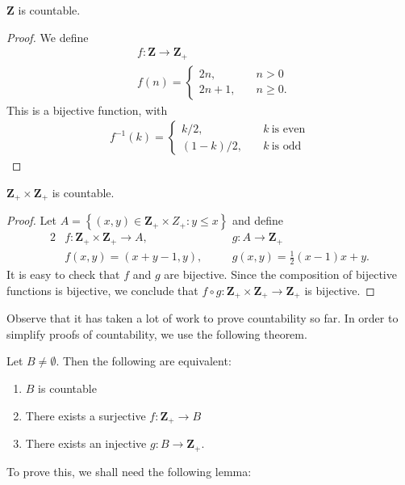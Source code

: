 \begin{claim}
	$\mathbf{Z}$ is countable.
\end{claim}
\begin{proof} We define
	\begin{equation*}
		\begin{split}
			& f: \mathbf{Z} \to \mathbf{Z}_{+}
			\\
			& f(n) = \begin{cases}
				2n, \quad & n > 0 \\
				2n+1, \quad & n \ge 0.
			\end{cases}
		\end{split}
	\end{equation*}
	This is a bijective function, with
	\begin{equation*}
		\begin{split}
			f^{-1}(k) =
			\begin{cases}
				k/2, \quad & k \ \text{is even} \\
				(1-k)/2, \quad & k \ \text{is odd}
			\end{cases}
		\end{split}
	\end{equation*}
\end{proof}
\begin{claim}
	$\mathbf{Z}_{+} \times \mathbf{Z}_{+}$ is countable.
\end{claim}
\begin{proof}Let $A = \left\{(x,y) \in \mathbf{Z}_{+} \times
	Z_{+}: y \le x\right\}$
	and define
	\begin{alignat*}{2}
			& f: \mathbf{Z}_{+} \times \mathbf{Z}_{+} \to A, \quad && g: A \to
			\mathbf{Z}_{+} \\
			& f(x,y) = (x + y-1, y),  \quad && g(x,y) = \frac{1}{2}(x-1)x + y.
		\end{alignat*}
	It is easy to check that $f$ and $g$ are bijective. Since the composition of
	bijective functions is bijective, we conclude that $f \circ g: \mathbf{Z}_{+}
	\times
\mathbf{Z}_{+} \to \mathbf{Z}_{+}$ is bijective.
\end{proof}

Observe that it has taken a lot of work to prove countability so far.
In order to simplify proofs of countability, we use the following theorem.
\begin{theorem}\label{thm:proof-countability}
	Let $B \neq \emptyset$. Then the following are equivalent:
	\begin{enumerate}
		\item\label{it:1} $B$ is countable
		\item\label{it:2} There exists a surjective $f: \mathbf{Z}_{+} \to B$
		\item\label{it:3} There exists an injective $g: B \to \mathbf{Z}_{+}$.
	\end{enumerate}
\end{theorem}
To prove this, we shall need the following lemma:

